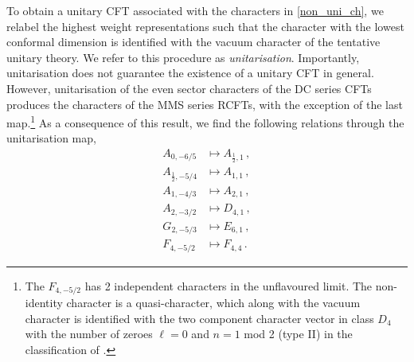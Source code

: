 \documentclass[a4paper,12pt]{article}
\begin{document}
%
%

To obtain a unitary CFT associated with the characters in \eqref{non_uni_ch}, we relabel the highest weight representations such that the character with the lowest conformal dimension is identified with the vacuum character of the tentative unitary theory. We refer to this procedure as \textit{unitarisation}. 
Importantly, unitarisation does not guarantee the existence of a unitary CFT in general. However, unitarisation of the even sector characters of the DC series CFTs produces the characters of the MMS series RCFTs, with the exception of the last map.\footnote{The $F_{4,-5/2}$ has 2 independent characters in the unflavoured limit. The non-identity character is a quasi-character, which along with the vacuum character is identified with the two component character vector in class $D_4$ with the number of zeroes $\ell=0$ and $n=1$ mod 2 (type II) in the classification of \cite{Chandra:2018pjq}.} As a consequence of this result, we find the following relations through the unitarisation map,
%
    \begin{align}\label{non-unitary to unitary series}
	A_{0,-6/5} &\mapsto A_{\frac{1}{2},1}\, ,\nonumber\\
	A_{\frac{1}{2},-5/4} & \mapsto A_{1,1} \, ,\nonumber\\
	A_{1,-4/3} & \mapsto  A_{2,1}\, ,\nonumber\\
	A_{2,-3/2} & \mapsto D_{4,1}\, ,\nonumber\\
	G_{2,-5/3} & \mapsto E_{6,1} \, ,\nonumber\\
    F_{4,-5/2} & \mapsto F_{4,4} \, .
    \end{align}
%
\end{document}
